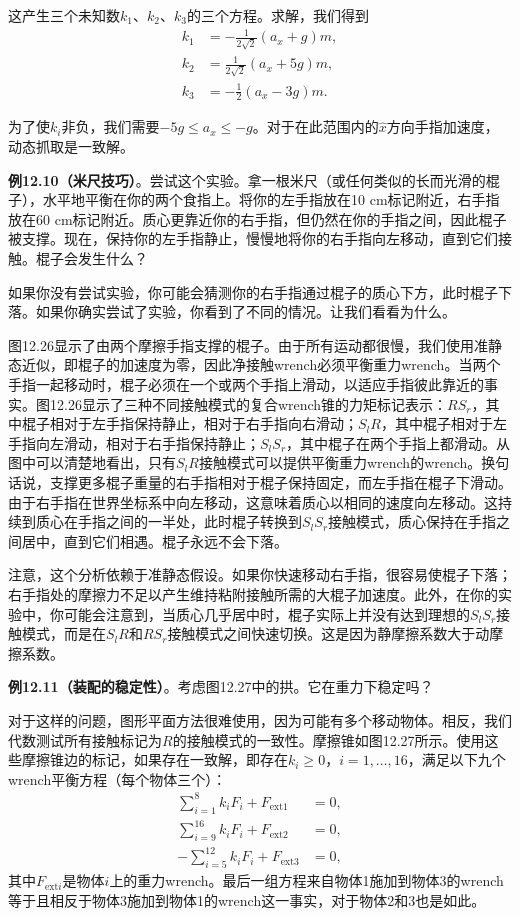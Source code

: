 \documentclass[12pt,a4paper]{article}
\begin{document}
这产生三个未知数$k_1$、$k_2$、$k_3$的三个方程。求解，我们得到
\begin{align}
k_1 &= -\frac{1}{2\sqrt{2}}(a_x + g)m, \\
k_2 &= \frac{1}{2\sqrt{2}}(a_x + 5g)m, \\
k_3 &= -\frac{1}{2}(a_x - 3g)m.
\end{align}

为了使$k_i$非负，我们需要$-5g \leq a_x \leq -g$。对于在此范围内的$\hat{x}$方向手指加速度，动态抓取是一致解。

\textbf{例12.10（米尺技巧）}。尝试这个实验。拿一根米尺（或任何类似的长而光滑的棍子），水平地平衡在你的两个食指上。将你的左手指放在10 cm标记附近，右手指放在60 cm标记附近。质心更靠近你的右手指，但仍然在你的手指之间，因此棍子被支撑。现在，保持你的左手指静止，慢慢地将你的右手指向左移动，直到它们接触。棍子会发生什么？

如果你没有尝试实验，你可能会猜测你的右手指通过棍子的质心下方，此时棍子下落。如果你确实尝试了实验，你看到了不同的情况。让我们看看为什么。

图12.26显示了由两个摩擦手指支撑的棍子。由于所有运动都很慢，我们使用准静态近似，即棍子的加速度为零，因此净接触wrench必须平衡重力wrench。当两个手指一起移动时，棍子必须在一个或两个手指上滑动，以适应手指彼此靠近的事实。图12.26显示了三种不同接触模式的复合wrench锥的力矩标记表示：$RS_r$，其中棍子相对于左手指保持静止，相对于右手指向右滑动；$S_lR$，其中棍子相对于左手指向左滑动，相对于右手指保持静止；$S_lS_r$，其中棍子在两个手指上都滑动。从图中可以清楚地看出，只有$S_lR$接触模式可以提供平衡重力wrench的wrench。换句话说，支撑更多棍子重量的右手指相对于棍子保持固定，而左手指在棍子下滑动。由于右手指在世界坐标系中向左移动，这意味着质心以相同的速度向左移动。这持续到质心在手指之间的一半处，此时棍子转换到$S_lS_r$接触模式，质心保持在手指之间居中，直到它们相遇。棍子永远不会下落。

注意，这个分析依赖于准静态假设。如果你快速移动右手指，很容易使棍子下落；右手指处的摩擦力不足以产生维持粘附接触所需的大棍子加速度。此外，在你的实验中，你可能会注意到，当质心几乎居中时，棍子实际上并没有达到理想的$S_lS_r$接触模式，而是在$S_lR$和$RS_r$接触模式之间快速切换。这是因为静摩擦系数大于动摩擦系数。

\textbf{例12.11（装配的稳定性）}。考虑图12.27中的拱。它在重力下稳定吗？

对于这样的问题，图形平面方法很难使用，因为可能有多个移动物体。相反，我们代数测试所有接触标记为$R$的接触模式的一致性。摩擦锥如图12.27所示。使用这些摩擦锥边的标记，如果存在一致解，即存在$k_i \geq 0$，$i = 1, \ldots, 16$，满足以下九个wrench平衡方程（每个物体三个）：
\begin{align}
\sum_{i=1}^8 k_i F_i + F_{\text{ext}1} &= 0, \\
\sum_{i=9}^{16} k_i F_i + F_{\text{ext}2} &= 0, \\
-\sum_{i=5}^{12} k_i F_i + F_{\text{ext}3} &= 0,
\end{align}
其中$F_{\text{ext}i}$是物体$i$上的重力wrench。最后一组方程来自物体1施加到物体3的wrench等于且相反于物体3施加到物体1的wrench这一事实，对于物体2和3也是如此。
\end{document}
